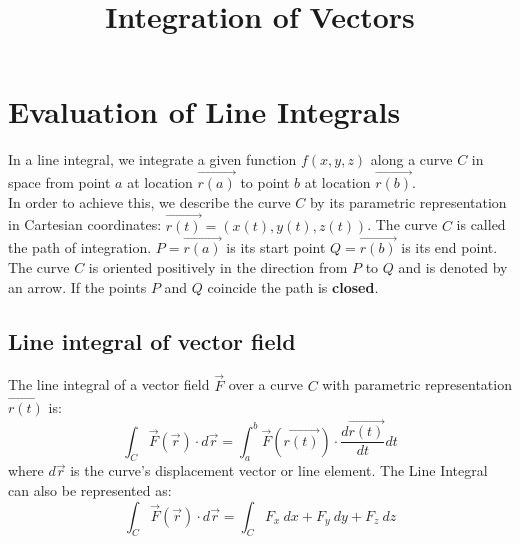 \documentclass[11pt]{article}
\title{Integration of Vectors}
\begin{document}
\maketitle
    \section{Evaluation of Line Integrals}\label{sec:evaluation-of-line-integrals}
        In a line integral, we integrate a given function $f(x,y,z)$ along a curve $C$
        in space from point $a$ at location $\vec{r(a)}$ to point $b$ at location $\vec{r(b)}$.
        \\
        In order to achieve this, we describe the curve $C$ by its parametric representation in Cartesian coordinates:
        $\vec{r(t)} = (x(t), y(t), z(t))$.
        The curve $C$ is called the path of integration. $P = \vec{r(a)}$ is its start point $Q = \vec{r(b)}$ is its end point.
        The curve $C$ is oriented positively in the direction from $P$ to $Q$ and is denoted by an arrow.
        If the points $P$ and $Q$ coincide the path is \textbf{closed}.

        \subsection{Line integral of vector field}\label{subsec:line-integral-of-vector-field}
            The line integral of a vector field $\vec{F}$ over a curve $C$ with parametric representation
            $\vec{r(t)}$ is:
            \begin{equation}
                \label{eq:equation}
                \int_{C} \vec{F}(\vec{r}) \cdot d\vec{r} = \int_{a}^{b} \vec{F}(\vec{r(t)}) \cdot \frac{d\vec{r(t)}}{dt} dt
            \end{equation}
            where $d\vec{r}$ is the curve's displacement vector or line element.
            The Line Integral can also be represented as:
            \begin{equation}
                \label{eq:equation2}
                \int_{C} \vec{F}(\vec{r}) \cdot d\vec{r} = \int_{C} F_x \: dx + F_y \: dy + F_z \: dz
            \end{equation}
\end{document}
